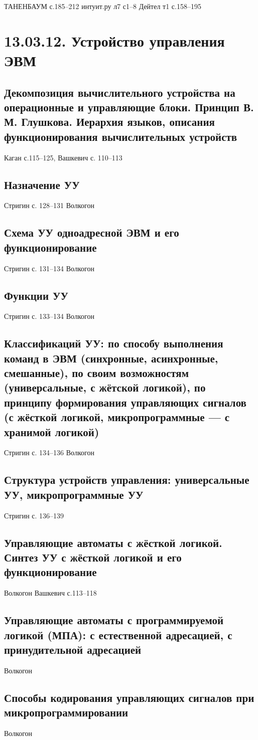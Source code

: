 \documentclass[a4paper,12pt,notitlepage,pdftex,headsepline]{scrartcl}
\begin{document}
  ТАНЕНБАУМ с.185--212
  интуит.ру л7 с1--8
  Дейтел т1 с.158--195




  \section{13.03.12. Устройство управления ЭВМ}
    \subsection{Декомпозиция вычислительного устройства на операционные и управляющие блоки. Принцип В.\,М. Глушкова. Иерархия языков, описания функционирования вычислительных устройств}
    Каган с.115--125, Вашкевич с. 110--113
    \subsection{Назначение УУ}
    Стригин с. 128--131
    Волкогон 
    \subsection{Схема УУ одноадресной ЭВМ и его функционирование}
    Стригин с. 131--134
    Волкогон
    \subsection{Функции УУ}
    Стригин с. 133--134
    Волкогон
    \subsection{Классификаций УУ: по способу выполнения команд в ЭВМ (синхронные, асинхронные, смешанные), по своим возможностям (универсальные, с жётской логикой), по принципу формирования управляющих сигналов (с жёсткой логикой, микропрограммные --- с хранимой логикой)}
    Стригин с. 134--136
    Волкогон
    \subsection{Структура устройств управления: универсальные УУ, микропрограммные УУ}
    Стригин с. 136--139
    \subsection{Управляющие автоматы с жёсткой логикой. Синтез УУ с жёсткой логикой и его функционирование}
    Волкогон
    Вашкевич с.113--118
    \subsection{Управляющие автоматы с программируемой логикой (МПА): с естественной адресацией, с принудительной адресацией}
    Волкогон
    \subsection{Способы кодирования управляющих сигналов при микропрограммировании}
    Волкогон
\end{document}
